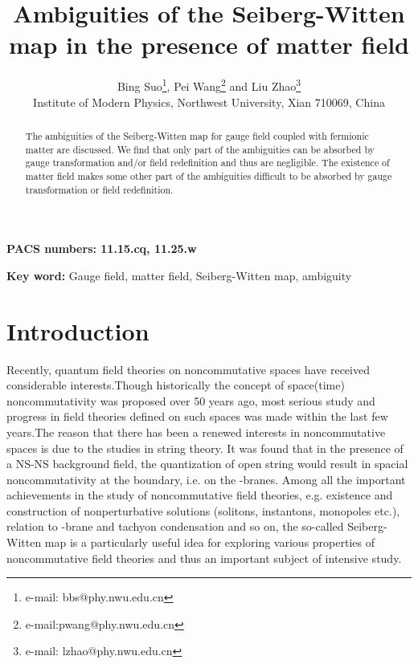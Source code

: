 \documentclass[a4paper,a4paper]{article}%
\begin{document}
\title{Ambiguities of the Seiberg-Witten map in the presence of matter field}
\author{Bing Suo\thanks{e-mail: bbs@phy.nwu.edu.cn},
Pei Wang\thanks{e-mail:pwang@phy.nwu.edu.cn} { } and
Liu Zhao\thanks{e-mail: lzhao@phy.nwu.edu.cn}
\\Institute of Modern Physics, Northwest University, Xian 710069, China}
\date{}
\maketitle

\begin{abstract}
The ambiguities of the Seiberg-Witten map for gauge field coupled with fermionic
matter are discussed. We find that only part of the ambiguities can be
absorbed by gauge transformation and/or field redefinition and thus are negligible.
The existence of matter field makes some other part of the ambiguities difficult
to be absorbed by gauge transformation or field redefinition.

\end{abstract}

\textbf{PACS numbers: 11.15.cq, 11.25.w}

\textbf{Key word:} Gauge field, matter field, Seiberg-Witten map, ambiguity

\section{Introduction}

Recently, quantum field theories on noncommutative spaces have received
considerable interests.Though historically the concept of space(time)
noncommutativity was proposed over 50 years ago\cite{1}, most serious study
and progress in field theories defined on such spaces was made within the last
few years\cite{2,3,4}.The reason that there has been a renewed interests in
noncommutative spaces is due to the studies in string theory\cite{5,6}. It was
found that in the presence of a NS-NS background \coordHE{} field, the quantization
of open string would result in spacial noncommutativity at the boundary, i.e.
on the \coordHE{}-branes. Among all the important achievements in the study of
noncommutative field theories, e.g. existence and construction of
nonperturbative solutions (solitons, instantons, monopoles etc.), relation to
\coordHE{}-brane and tachyon condensation and so on, the so-called Seiberg-Witten
map\cite{6} is a particularly useful idea for exploring various properties of
noncommutative field theories and thus an important subject of intensive study.
\end{document}
